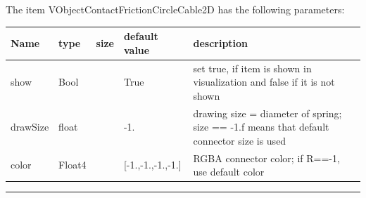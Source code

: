 The item VObjectContactFrictionCircleCable2D has the following parameters:\vspace{-1cm}\\ 
\begin{center}
  \footnotesize
  \begin{longtable}{| p{4.5cm} | p{2.5cm} | p{0.5cm} | p{2.5cm} | p{6cm} |}
    \hline
    \bf Name & \bf type & \bf size & \bf default value & \bf description \\ \hline
    show &     Bool &      &     True &     set true, if item is shown in visualization and false if it is not shown\\ \hline
    drawSize &     float &      &     -1. &     drawing size = diameter of spring; size == -1.f means that default connector size is used\\ \hline
    color &     Float4 &      &     [-1.,-1.,-1.,-1.] &     RGBA connector color; if R==-1, use default color\\ \hline
	  \end{longtable}
	\end{center}
\par\noindent\rule{\textwidth}{0.4pt}
\label{description_ObjectContactFrictionCircleCable2D}
